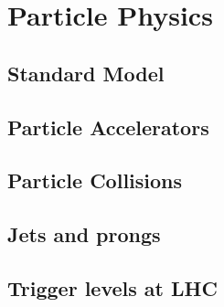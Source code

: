 \section{Particle Physics}


\subsection{Standard Model}


\subsection{Particle Accelerators}


\subsection{Particle Collisions}


\subsection{Jets and prongs}


\subsection{Trigger levels at LHC}
